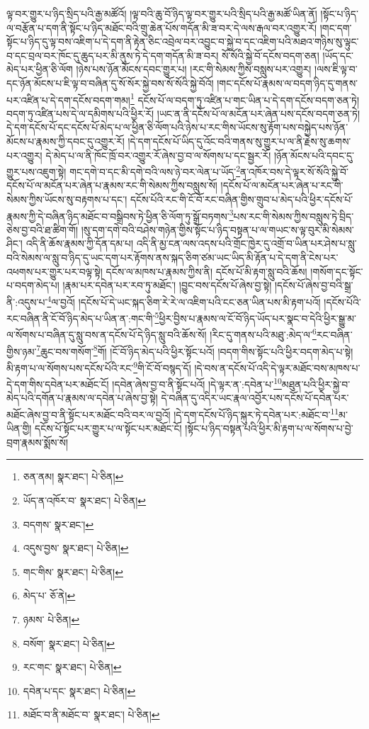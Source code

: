 ལྟ་བར་གྱུར་པ་ཉིད་སྲིད་པའི་རྒྱ་མཚོའོ། །ལྟ་བའི་ཆུ་བོ་ཉིད་ལྟ་བར་གྱུར་པའི་སྲིད་པའི་རྒྱ་མཚོ་ཡིན་ནོ། །སྟོང་པ་ཉིད་ལ་བརྩོན་པ་དག་ནི་སྟོང་པ་ཉིད་མཐོང་བའི་གྲུ་ཆེན་པོས་གདོན་མི་ཟ་བར་དེ་ལས་རྒལ་བར་འགྱུར་རོ། །གང་དག་སྟོང་པ་ཉིད་དུ་ལྟ་བས་འཇིག་པ་དེ་དག་ནི་རྟེན་ཅིང་འབྲེལ་བར་འབྱུང་བ་སྐྱེ་བ་དང་འཇིག་པའི་མཐའ་གཉིས་སུ་ལྟུང་བ་དང་བྲལ་བར་ཁོང་དུ་ཆུད་པར་མི་ནུས་ཏེ་དེ་དག་གདོན་མི་ཟ་བར། སོ་སོའི་སྐྱེ་བོ་དངོས་བདག་ཅན། །ཡོད་དང་མེད་པར་ཕྱིན་ཅི་ལོག །ཉེས་པས་ཉོན་མོངས་དབང་གྱུར་པ། །རང་གི་སེམས་ཀྱིས་བསླུས་པར་འགྱུར། །ལས་ཇི་ལྟ་བ་དང་ཉོན་མོངས་པ་ཇི་ལྟ་བ་བཞིན་དུ་སོ་སོར་སྐྱེ་བས་སོ་སོའི་སྐྱེ་བོའོ། །གང་དངོས་པོ་རྣམས་ལ་བདག་ཉིད་དུ་གནས་པར་འཛིན་པ་དེ་དག་དངོས་བདག་གམ།\footnote{ཅན་ནམ།  སྣར་ཐང་།  པེ་ཅིན། } དངོས་པོ་ལ་བདག་ཏུ་འཛིན་པ་གང་ཡིན་པ་དེ་དག་དངོས་བདག་ཅན་ཏེ། བདག་ཏུ་འཛིན་པས་དེ་ལ་དམིགས་པའི་ཕྱིར་རོ། །ཡང་ན་ནི་དངོས་པོ་ལ་མངོན་པར་ཞེན་པས་དངོས་བདག་ཅན་ཏེ། དེ་དག་དངོས་པོ་དང་དངོས་པོ་མེད་པ་ལ་ཕྱིན་ཅི་ལོག་པའི་ཉེས་པ་རང་གིས་ཡོངས་སུ་རྟོག་པས་བསྐྱེད་པས་ཉོན་མོངས་པ་རྣམས་ཀྱི་དབང་དུ་འགྱུར་རོ། །དེ་དག་དངོས་པོ་ཡིད་དུ་འོང་བའི་གནས་སུ་གྱུར་པ་ལ་ནི་རྗེས་སུ་ཆགས་པར་འགྱུར། དེ་མེད་པ་ལ་ནི་ཁོང་ཁྲོ་བར་འགྱུར་རོ་ཞེས་བྱ་བ་ལ་སོགས་པ་དང་སྦྱར་རོ། །ཉོན་མོངས་པའི་དབང་དུ་གྱུར་པས་འཇུག་སྟེ། གང་དགེ་བ་དང་མི་དགེ་བའི་ལས་ཉེ་བར་ལེན་པ་ཡོད་\footnote{ཡོད་ན་འཁོར་བ་  སྣར་ཐང་།  པེ་ཅིན། }ན་འཁོར་བས་དེ་ལྟར་སོ་སོའི་སྐྱེ་བོ་དངོས་པོ་ལ་མངོན་པར་ཞེན་པ་རྣམས་རང་གི་སེམས་ཀྱིས་བསླུས་སོ། །དངོས་པོ་ལ་མངོན་པར་ཞེན་པ་རང་གི་སེམས་ཀྱིས་ཡོངས་སུ་བརྟགས་པ་དང་། དངོས་པོའི་རང་གི་ངོ་བོ་རང་བཞིན་གྱིས་གྲུབ་པ་མེད་པའི་ཕྱིར་དངོས་པོ་རྣམས་ཀྱི་དེ་བཞིན་ཉིད་མཐོང་བ་བསྒྲིབས་ཏེ་ཕྱིན་ཅི་ལོག་ཏུ་སྒྲོ་བཏགས་\footnote{བདགས་  སྣར་ཐང་། }པས་རང་གི་སེམས་ཀྱིས་བསླུས་ཏེ་བྲིད་ཅེས་བྱ་བའི་ཐ་ཚིག་གོ། །སུ་དག་དགེ་བའི་བཤེས་གཉེན་གྱིས་སྟོང་པ་ཉིད་བསྟན་པ་ལ་གཡང་ས་ལྟ་བུར་མི་སེམས་ཤིང་། འདི་ནི་ཆོས་རྣམས་ཀྱི་དོན་དམ་པ། འདི་ནི་མྱ་ངན་ལས་འདས་པའི་གྲོང་ཁྱེར་དུ་འགྲོ་བ་ཡིན་པར་ཤེས་པ་སླུ་བའི་སེམས་ལ་སླུ་བ་ཉིད་དུ་ཡང་དག་པར་རྟོགས་ནས་སྐད་ཅིག་ཙམ་ཡང་ཡིད་མི་རྟོན་པ་དེ་དག་ནི་ངེས་པར་འཕགས་པར་གྱུར་པར་བལྟ་སྟེ། དངོས་ལ་མཁས་པ་རྣམས་ཀྱིས་ནི། དངོས་པོ་མི་རྟག་སླུ་བའི་ཆོས། །གསོག་དང་སྟོང་པ་བདག་མེད་པ། །རྣམ་པར་དབེན་པར་རབ་ཏུ་མཐོང་། །བྱུང་བས་དངོས་པོ་ཞེས་བྱ་སྟེ། །དངོས་པོ་ཞེས་བྱ་བའི་སྒྲ་ནི་:འདུས་པ་\footnote{འདུས་བྱས་  སྣར་ཐང་།  པེ་ཅིན། }ལ་བྱའོ། །དངོས་པོ་དེ་ཡང་སྐད་ཅིག་རེ་རེ་ལ་འཇིག་པའི་ངང་ཅན་ཡིན་པས་མི་རྟག་པའོ། །དངོས་པོའི་རང་བཞིན་ནི་ངོ་བོ་ཉིད་མེད་པ་ཡིན་ན་:གང་གི་\footnote{གང་གིས་  སྣར་ཐང་།  པེ་ཅིན། }ཕྱིར་བྱིས་པ་རྣམས་ལ་ངོ་བོ་ཉིད་ཡོད་པར་སྣང་བ་དེའི་ཕྱིར་སྒྱུ་མ་ལ་སོགས་པ་བཞིན་དུ་སླུ་བས་ན་དངོས་པོ་དེ་ཉིད་སླུ་བའི་ཆོས་སོ། །རིང་དུ་གནས་པའི་མཐུ་:མེད་ལ་\footnote{མེད་པ་  ཅོ་ནེ། }རང་བཞིན་གྱིས་ཉམ་\footnote{ཉམས་  པེ་ཅིན། }ཆུང་བས་གསོག་\footnote{བསོག་  སྣར་ཐང་།  པེ་ཅིན། }གོ། །ངོ་བོ་ཉིད་མེད་པའི་ཕྱིར་སྟོང་པའོ། །བདག་གིས་སྟོང་པའི་ཕྱིར་བདག་མེད་པ་སྟེ། མི་རྟག་པ་ལ་སོགས་པས་དངོས་པོའི་རང་\footnote{རང་གང་  སྣར་ཐང་།  པེ་ཅིན། }གི་ངོ་བོ་བསྙད་དོ། །དེ་བས་ན་དངོས་པོ་འདི་དེ་ལྟར་མཐོང་བས་མཁས་པ་དེ་དག་གིས་དབེན་པར་མཐོང་ངོ། །དབེན་ཞེས་བྱ་བ་ནི་སྟོང་པའོ། །དེ་ལྟར་ན་:དབེན་པ་\footnote{དབེན་པ་དང་  སྣར་ཐང་།  པེ་ཅིན། }མཐུན་པའི་ཕྱིར་སྐྱེ་བ་མེད་པའི་དགོན་པ་རྣམས་ལ་དབེན་པ་ཞེས་བྱ་སྟེ། དེ་བཞིན་དུ་འདིར་ཡང་རྣལ་འབྱོར་པས་དངོས་པོ་དབེན་པར་མཐོང་ཞེས་བྱ་བ་ནི་སྟོང་པར་མཐོང་བའི་བར་ལ་བྱའོ། །དེ་དག་དངོས་པོ་ཉིད་སྐུར་ཏེ་དབེན་པར་:མཐོང་བ་\footnote{མཐོང་བ་ནི་མཐོང་བ་  སྣར་ཐང་།  པེ་ཅིན། }མ་ཡིན་གྱི། དངོས་པོ་སྟོང་པར་གྱུར་པ་ལ་སྟོང་པར་མཐོང་ངོ། །སྟོང་པ་ཉིད་བསྟན་པའི་ཕྱིར་མི་རྟག་པ་ལ་སོགས་པ་བྱེ་བྲག་རྣམས་སྨོས་སོ། 